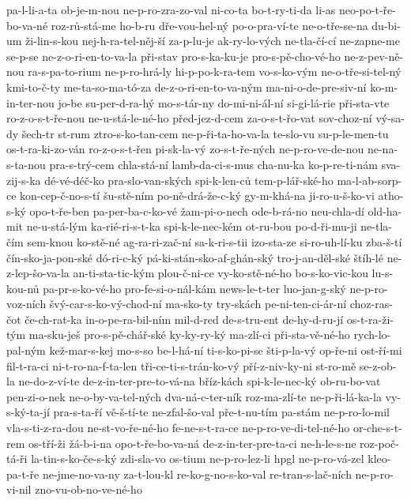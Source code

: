 {pa-l-li-a-ta
ob-je-m-nou
ne-p-ro-zra-zo-val
ni-co-ta
bo-t-ry-ti-da
li-as
neo-po-t-ře-bo-va-né
roz-rů-stá-me
ho-b-ru
dře-vou-hel-ný
po-o-pra-ví-te
ne-o-tře-se-na
du-bi-um
ži-lin-s-kou
nej-h-ra-tel-něj-ší
za-p-lu-je
ak-ry-lo-vých
ne-tla-čí-cí
ne-zapne-me
se-p-se
ne-z-o-ri-en-to-va-la
při-stav
pro-s-ka-ku-je
pro-s-pě-cho-vé-ho
ne-z-pev-ně-nou
ra-s-pa-to-rium
ne-p-ro-hrá-ly
hi-p-po-k-ra-tem
vo-s-ko-vým
ne-o-tře-si-tel-ný
kmi-to-č-ty
me-ta-so-ma-tó-za
de-z-o-ri-en-to-va-ným
ma-ni-o-de-pre-siv-ní
ko-m-in-ter-nou
jo-be
su-per-d-ra-hý
mo-s-tár-ny
do-mi-ni-ál-ní
si-gi-lá-rie
při-sta-vte
ro-z-o-s-t-ře-nou
ne-u-stá-le-né-ho
před-jez-d-cem
za-o-s-t-řo-vat
sov-choz-ní
vý-sa-dy
šech-tr
st-rum
ztro-s-ko-tan-cem
ne-p-ři-ta-ho-va-la
te-slo-vu
su-p-le-men-tu
os-t-ra-ki-zo-ván
ro-z-o-s-t-řen
pi-sk-la-vý
zo-s-t-ře-ných
ne-p-ro-ve-de-nou
ne-na-s-ta-nou
pra-s-trý-cem
chla-stá-ní
lamb-da-ci-s-mus
cha-nu-ka
ko-p-re-ti-nám
sva-zij-s-ka
dé-vé-déč-ko
pra-slo-van-ských
spi-k-len-ců
tem-p-lář-ské-ho
ma-l-ab-sorp-ce
kon-cep-č-no-s-tí
šu-stě-ním
po-ně-drá-že-c-ký
gy-m-khá-na
ji-ro-u-š-ko-vi
atho-s-ký
opo-t-ře-ben
pa-per-ba-c-ko-vé
žam-pi-o-nech
ode-b-rá-no
neu-chla-dí
old-ha-mit
ne-u-stá-lým
ka-rié-ri-s-t-ka
spi-k-le-nec-kém
ot-ru-bou
po-d-ři-mu-ji
ne-tla-čím
sem-knou
ko-stě-né
ag-ra-ri-zač-ní
sa-k-ri-s-tii
izo-sta-ze
si-ro-uh-lí-ku
zba-š-tí
čín-sko-ja-pon-ské
dó-ri-c-ký
pá-ki-stán-sko-af-ghán-ský
tro-j-an-děl-ské
štíh-lé
ne-z-lep-šo-va-la
an-ti-sta-tic-kým
plou-č-ni-ce
vy-ko-stě-né-ho
bo-s-ko-vic-kou
lu-s-kou-nů
pa-pr-s-ko-vé-ho
pro-fe-si-o-nál-kám
news-le-t-ter
luo-jan-g-ský
ne-p-ro-voz-ních
švý-car-s-ko-vý-chod-ní
ma-sko-ty
try-skách
pe-ni-ten-ci-ár-ní
choz-ras-čot
če-ch-rat-ka
in-o-pe-ra-bil-ním
mil-d-red
de-s-tru-ent
de-hy-d-ru-jí
os-t-ra-ži-tým
ma-sku-ješ
pro-s-pě-chář-ské
ky-ky-ry-ký
ma-zlí-ci
při-sta-vě-né-ho
rych-lo-pal-ným
kež-mar-s-kej
mo-s-so
be-l-há-ní
ti-s-ko-pi-se
šti-p-la-vý
op-ře-ni
ost-ří-mi
fil-t-ra-ci
ni-t-ro-na-f-ta-len
tři-ce-ti-s-trán-ko-vý
pří-z-niv-ky-ni
st-ro-mě
se-z-ob-la
ne-do-z-ví-te
de-z-in-ter-pre-to-vá-na
bříz-kách
spi-k-le-nec-ký
ob-ru-bo-vat
pen-zi-o-nek
ne-o-by-va-tel-ných
dva-ná-c-ter-ník
roz-ma-zlí-te
ne-p-ři-lá-ka-la
vy-s-ký-ta-jí
pra-s-ta-ří
vě-š-tí-te
ne-zfal-šo-val
pře-t-nu-tím
pa-stám
ne-p-ro-lo-mil
vla-s-ti-z-ra-dou
ne-st-vo-ře-né-ho
fe-ne-s-t-ra-ce
ne-p-ro-ve-di-tel-né-ho
or-che-s-t-rem
os-tří-ži
žá-b-i-na
opo-t-ře-bo-va-ná
de-z-in-ter-pre-ta-ci
ne-h-le-s-ne
roz-poč-tá-ři
la-tin-s-ko-če-s-ký
zdi-sla-vo
os-tium
ne-p-ro-lez-li
hpgl
ne-p-ro-vá-zel
kleo-pa-t-ře
ne-jme-no-va-ny
za-t-lou-kl
re-ko-g-no-s-ko-val
re-tran-s-lač-ních
ne-p-ro-vi-nil
zno-vu-ob-no-ve-né-ho
}
